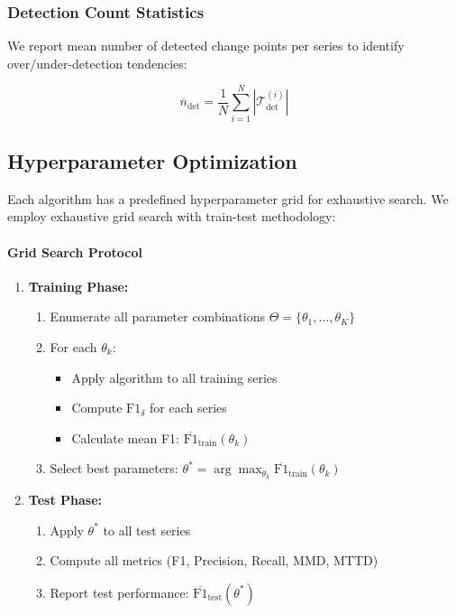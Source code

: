\subsubsection{Detection Count Statistics}

We report mean number of detected change points per series to identify over/under-detection tendencies:

\begin{equation}
\overline{n}_{\text{det}} = \frac{1}{N} \sum_{i=1}^{N} |\mathcal{T}_{\text{det}}^{(i)}|
\end{equation}

\subsection{Hyperparameter Optimization}
\label{sec:hyperparameter_opt}

Each algorithm has a predefined hyperparameter grid for exhaustive search. We employ exhaustive grid search with train-test methodology:

\paragraph{Grid Search Protocol}

\begin{enumerate}
    \item \textbf{Training Phase:}
    \begin{enumerate}
        \item Enumerate all parameter combinations $\Theta = \{\theta_1, \ldots, \theta_K\}$
        \item For each $\theta_k$:
        \begin{itemize}
            \item Apply algorithm to all training series
            \item Compute $\text{F1}_{\delta}$ for each series
            \item Calculate mean F1: $\overline{\text{F1}}_{\text{train}}(\theta_k)$
        \end{itemize}
        \item Select best parameters: $\theta^* = \arg\max_{\theta_k} \overline{\text{F1}}_{\text{train}}(\theta_k)$
    \end{enumerate}
    
    \item \textbf{Test Phase:}
    \begin{enumerate}
        \item Apply $\theta^*$ to all test series
        \item Compute all metrics (F1, Precision, Recall, MMD, MTTD)
        \item Report test performance: $\overline{\text{F1}}_{\text{test}}(\theta^*)$
    \end{enumerate}
\end{enumerate}

